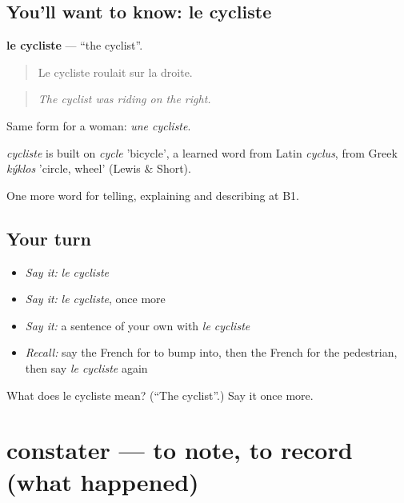 \subsection*{You'll want to know: le cycliste}
\textbf{le cycliste} — \textquotedblleft{}the cyclist\textquotedblright{}.

\begin{quote}
Le cycliste roulait sur la droite.
\end{quote}

\begin{quote}
\emph{The cyclist was riding on the right.}
\end{quote}

Same form for a woman: \emph{une cycliste}.

\begin{cousinweb}
\emph{cycliste} is built on \emph{cycle} 'bicycle', a learned word from Latin \emph{cyclus}, from Greek \emph{kýklos} 'circle, wheel' (Lewis \& Short).
\end{cousinweb}

\begin{grammarlens}[title={What you've built}]
One more word for telling, explaining and describing at B1.
\end{grammarlens}

\subsection*{Your turn}
\begin{itemize}
\raggedright
  \item \emph{Say it:} \emph{le cycliste}
  \item \emph{Say it:} \emph{le cycliste}, once more
  \item \emph{Say it:} a sentence of your own with \emph{le cycliste}
  \item \emph{Recall:} say the French for to bump into, then the French for the pedestrian, then say \emph{le cycliste} again
\end{itemize}

\begin{tcolorbox}[breakable,colback=teal!4,colframe=teal!35!black,title={Before you move on}]
What does le cycliste mean? (\textquotedblleft{}The cyclist\textquotedblright{}.) Say it once more.
\end{tcolorbox}
\section[constater]{constater — to note, to record (what happened)}

